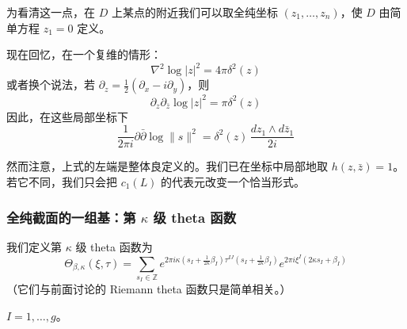 为看清这一点，在 $D$ 上某点的附近我们可以取全纯坐标 $(z_1,\dots,z_n)$，使 $D$ 由简单方程 $z_1 = 0$ 定义。

现在回忆，在一个复维的情形：
\begin{equation}
  \nabla^2\log|z|^2 = 4\pi\delta^2(z)
  \tag{E.62}
  \label{eq:E.62}
\end{equation}
或者换个说法，若 $\partial_z = \frac{1}{2}(\partial_x - i\partial_y)$，则
\begin{equation}
  \partial_z\partial_{\bar z}\log|z|^2 = \pi\delta^2(z)
  \tag{E.63}
  \label{eq:E.63}
\end{equation}
因此，在这些局部坐标下
\begin{equation}
  \frac{1}{2\pi i}\partial\bar\partial\log\|s\|^2
  = \delta^2(z)\,\frac{dz_1\wedge d\bar z_1}{2i}
  \tag{E.64}
  \label{eq:E.64}
\end{equation}


然而注意，上式的左端是整体良定义的。我们已在坐标中局部地取 $h(z,\bar z) = 1$。若它不同，我们只会把 $c_1(L)$ 的代表元改变一个恰当形式。

\subsubsection{全纯截面的一组基：第 $\kappa$ 级 theta 函数} %

我们定义第 $\kappa$ 级 theta 函数为
\begin{equation}
  \Theta_{\beta,\kappa}(\xi,\tau)
  = \sum_{s_I\in\mathbb{Z}}
    e^{2\pi i\kappa\left(s_I+\frac{1}{2\kappa}\beta_I\right)\tau^{IJ}
          \left(s_I+\frac{1}{2\kappa}\beta_I\right)}
    e^{2\pi i\xi^I(2\kappa s_I+\beta_I)}
  \tag{E.65}
  \label{eq:E.65}
\end{equation}
（它们与前面讨论的 Riemann theta 函数只是简单相关。）

$I = 1,\dots,g$。

